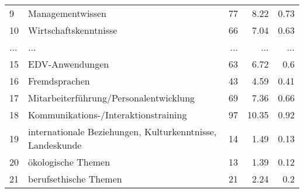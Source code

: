 \begin{longtable}{lXrrr}
        9 & \multicolumn{1}{X}{Managementwissen} & %
          \num{77} &
          \num[round-mode=places,round-precision=2]{8,22} &
          \num[round-mode=places,round-precision=2]{0,73} \\
        10 & \multicolumn{1}{X}{Wirtschaftskenntnisse} & %
          \num{66} &
          \num[round-mode=places,round-precision=2]{7,04} &
          \num[round-mode=places,round-precision=2]{0,63} \\
       ... & ... & ... & ... & ... \\
        15 & \multicolumn{1}{X}{EDV-Anwendungen} & %
          \num{63} &
          \num[round-mode=places,round-precision=2]{6,72} &
          \num[round-mode=places,round-precision=2]{0,6} \\

        16 & \multicolumn{1}{X}{Fremdsprachen} & %
          \num{43} &
          \num[round-mode=places,round-precision=2]{4,59} &
          \num[round-mode=places,round-precision=2]{0,41} \\

        17 & \multicolumn{1}{X}{Mitarbeiterführung/Personalentwicklung} & %
          \num{69} &
          \num[round-mode=places,round-precision=2]{7,36} &
          \num[round-mode=places,round-precision=2]{0,66} \\

        18 & \multicolumn{1}{X}{Kommunikations-/Interaktionstraining} & %
          \num{97} &
          \num[round-mode=places,round-precision=2]{10,35} &
          \num[round-mode=places,round-precision=2]{0,92} \\

        19 & \multicolumn{1}{X}{internationale Beziehungen, Kulturkenntnisse, Landeskunde} & %
          \num{14} &
          \num[round-mode=places,round-precision=2]{1,49} &
          \num[round-mode=places,round-precision=2]{0,13} \\

        20 & \multicolumn{1}{X}{ökologische Themen} & %
          \num{13} &
          \num[round-mode=places,round-precision=2]{1,39} &
          \num[round-mode=places,round-precision=2]{0,12} \\

        21 & \multicolumn{1}{X}{berufsethische Themen} & %
          \num{21} &
          \num[round-mode=places,round-precision=2]{2,24} &
          \num[round-mode=places,round-precision=2]{0,2} \\


\end{longtable}
